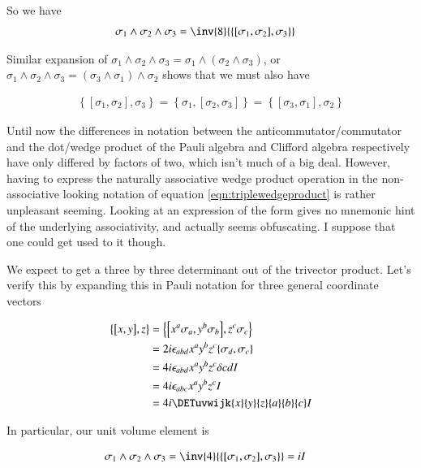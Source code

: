 \documentclass{article}
\newcommand{\symmetric}[2]{{\left\{{#1},{#2}\right\}}}
\newcommand{\antisymmetric}[2]{\left[{#1},{#2}\right]}
\begin{document}
So we have
\begin{align}\label{eqn:triplewedgeproduct}
\sigma_1 \wedge \sigma_2 \wedge \sigma_3 
&= \inv{8} \symmetric{\antisymmetric{\sigma_1}{\sigma_2}}{\sigma_3}
\end{align}

Similar expansion of $\sigma_1 \wedge \sigma_2 \wedge \sigma_3 = \sigma_1 \wedge (\sigma_2 \wedge \sigma_3)$, or
$\sigma_1 \wedge \sigma_2 \wedge \sigma_3 = (\sigma_3 \wedge \sigma_1) \wedge \sigma_2$
 shows that we must also have

\begin{align}
\symmetric{\antisymmetric{\sigma_1}{\sigma_2}}{\sigma_3}
= \symmetric{\sigma_1}{\antisymmetric{\sigma_2}{\sigma_3}}
= \symmetric{\antisymmetric{\sigma_3}{\sigma_1}}{\sigma_2}
\end{align}

Until now the differences in notation between the anticommutator/commutator and the dot/wedge product of the Pauli algebra and Clifford algebra respectively have only differed by factors of two, which isn't much of a big deal.  However, having to express the naturally associative wedge product operation in the non-associative looking notation of equation \ref{eqn:triplewedgeproduct} is rather unpleasant seeming.  Looking at an expression of the form gives no mnemonic
hint of the underlying associativity, and actually seems obfuscating.  I suppose that one could get used to it though.

We expect to get a three by three determinant out of the trivector product.
Let's verify this by expanding this in Pauli notation for three general coordinate vectors

\begin{align*}
\symmetric{\antisymmetric{x}{y}}{z} 
&= \symmetric{\antisymmetric{x^a \sigma_a}{y^b \sigma_b}}{ z^c \sigma_c} \\
&= 2 i \epsilon_{a b d} x^a y^b z^c \symmetric{\sigma_d}{\sigma_c} \\
&= 4 i \epsilon_{a b d} x^a y^b z^c \delta{c d} I \\
&= 4 i \epsilon_{a b c} x^a y^b z^c I \\
&= 4 i \DETuvwijk{x}{y}{z}{a}{b}{c} I
\end{align*}

In particular, our unit volume element is 

\begin{align}
\sigma_1 \wedge \sigma_2 \wedge \sigma_3 
&= \inv{4} \symmetric{\antisymmetric{\sigma_1}{\sigma_2}}{\sigma_3} = i I
\end{align}
\end{document}
